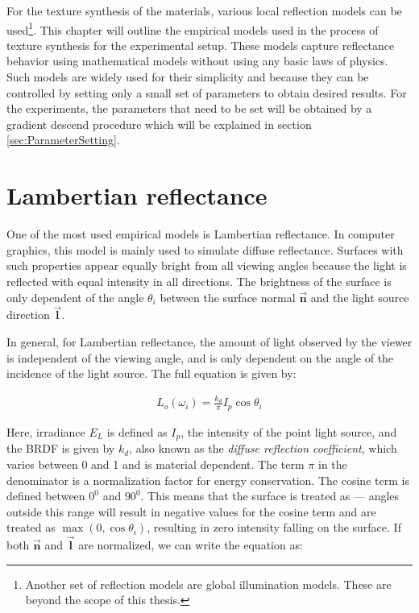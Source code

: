 \hypertarget{empiricalModels}{
}

\noindent For the texture synthesis of the materials, various local reflection models can be used\footnote[1]{Another set of reflection models are global illumination models. These are beyond the scope of this thesis.}. This chapter will outline the empirical models used in the process of texture synthesis for the experimental setup. These models capture reflectance behavior using mathematical models without using any basic laws of physics. Such models are widely used for their simplicity and because they can be controlled by setting only a small set of parameters to obtain desired results. For the experiments, the parameters that need to be set will be obtained by a gradient descend procedure which will be explained in section \ref{sec:ParameterSetting}.

\section{Lambertian reflectance}\label{sec:Lambertian}
	One of the most used empirical models is Lambertian reflectance. In computer graphics, this model is mainly used to simulate diffuse reflectance. Surfaces with such properties appear equally bright from all viewing angles because the light is reflected with equal intensity in all directions. The brightness of the surface is only dependent of the angle $\theta_i$ between the surface normal $\vec{\mathbf{n}}$ and the light source direction $\vec{\mathbf{l}}$. 

In general, for Lambertian reflectance, the amount of light observed by the viewer is independent of the viewing angle, and is only dependent on the angle of the incidence of the light source. The full equation is given by:

		\begin{eqnarray*}
			L_o(\omega_i) = \frac{k_d}{\pi}I_p\cos\theta_i
		\end{eqnarray*}

Here, irradiance $E_L$ is defined as $I_p$, the intensity of the point light source, and the BRDF is given by $k_d$, also known as the {\it diffuse reflection coefficient}, which varies between 0 and 1 and is material dependent. The term $\pi$ in the denominator is a normalization factor for energy conservation. The cosine term is defined between $0^0$ and $90^0$. This means that the surface is treated as  --- angles outside this range will result in negative values for the cosine term and are treated as $\max({0,\cos\theta_i})$, resulting in zero intensity falling on the surface. If both $\vec{\mathbf{n}}$ and $\vec{\mathbf{l}}$ are normalized, we can write the equation as:

